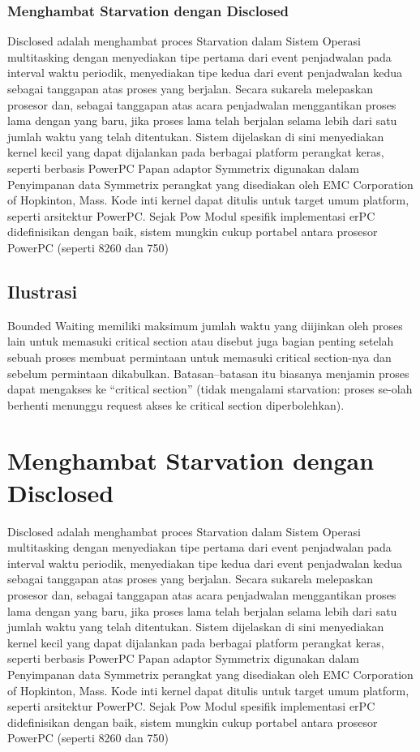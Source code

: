 \subsubsection {Menghambat Starvation dengan Disclosed}
\cite{chalmer2004inhibiting} Disclosed adalah menghambat proces Starvation dalam Sistem Operasi multitasking dengan menyediakan tipe pertama dari event penjadwalan pada interval waktu periodik, menyediakan tipe kedua dari event penjadwalan kedua sebagai tanggapan atas proses yang berjalan. Secara sukarela melepaskan prosesor dan, sebagai tanggapan atas acara penjadwalan menggantikan proses lama dengan yang baru, jika proses lama telah berjalan selama lebih dari satu jumlah waktu yang telah ditentukan. Sistem dijelaskan di sini menyediakan kernel kecil yang dapat dijalankan pada berbagai platform perangkat keras, seperti berbasis PowerPC Papan adaptor Symmetrix digunakan dalam Penyimpanan data Symmetrix perangkat yang disediakan oleh EMC Corporation of Hopkinton, Mass. Kode inti kernel dapat ditulis untuk target umum platform, seperti arsitektur PowerPC. Sejak Pow Modul spesifik implementasi erPC didefinisikan dengan baik, sistem mungkin cukup portabel antara prosesor PowerPC (seperti 8260 dan 750)
\subsection{Ilustrasi}

Bounded Waiting memiliki maksimum jumlah waktu yang diijinkan oleh proses lain untuk memasuki critical section atau disebut juga bagian penting  setelah sebuah proses membuat permintaan untuk memasuki critical section-nya dan sebelum permintaan dikabulkan. Batasan–batasan itu biasanya menjamin proses dapat mengakses ke “critical section” (tidak mengalami starvation: proses se-olah berhenti menunggu request akses ke critical section diperbolehkan).


\section {Menghambat Starvation dengan Disclosed}
Disclosed adalah menghambat proces Starvation dalam Sistem Operasi multitasking dengan menyediakan tipe pertama dari event penjadwalan pada interval waktu periodik, menyediakan tipe kedua dari event penjadwalan kedua sebagai tanggapan atas proses yang berjalan. Secara sukarela melepaskan prosesor dan, sebagai tanggapan atas acara penjadwalan menggantikan proses lama dengan yang baru, jika proses lama telah berjalan selama lebih dari satu jumlah waktu yang telah ditentukan. Sistem dijelaskan di sini menyediakan kernel kecil yang dapat dijalankan pada berbagai platform perangkat keras, seperti berbasis PowerPC Papan adaptor Symmetrix digunakan dalam Penyimpanan data Symmetrix perangkat yang disediakan oleh EMC Corporation of Hopkinton, Mass. Kode inti kernel dapat ditulis untuk target umum platform, seperti arsitektur PowerPC. Sejak Pow Modul spesifik implementasi erPC didefinisikan dengan baik, sistem mungkin cukup portabel antara prosesor PowerPC (seperti 8260 dan 750)



